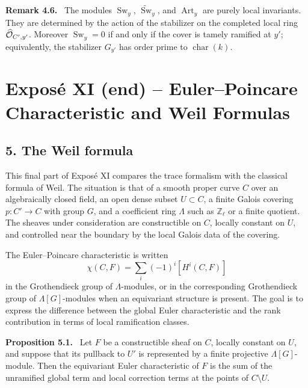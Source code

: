 \documentclass[11pt]{article}
\theoremstyle{plain}
\theoremstyle{definition}
\theoremstyle{remark}
\newenvironment{statement}[1]{\par\medskip\noindent\textbf{#1.}\ }{\par\medskip}
\newcommand{\ZZ}{\mathbb Z}
\newcommand{\wt}[1]{\widetilde{#1}}
\providecommand{\Sw}{\operatorname{Sw}}
\providecommand{\Art}{\operatorname{Art}}
\providecommand{\wh}{\widehat}
\begin{document}
\begin{statement}{Remark 4.6}
The modules $\Sw_y$, $\wt{\Sw}_y$, and $\Art_y$ are purely local invariants. They are determined by the action of the stabilizer on the completed local ring $\wh{\cO}_{C',y'}$. Moreover $\Sw_y=0$ if and only if the cover is tamely ramified at $y'$; equivalently, the stabilizer $G_{y'}$ has order prime to $\operatorname{char}(k)$.
\end{statement}

\newpage

\section*{Expos\'e XI (end) -- Euler--Poincare Characteristic and Weil Formulas}

\subsection*{5. The Weil formula}

This final part of Expos\'e XI compares the trace formalism with the classical formula of Weil. The situation is that of a smooth proper curve $C$ over an algebraically closed field, an open dense subset $U\subset C$, a finite Galois covering $p:C'\to C$ with group $G$, and a coefficient ring $\Lambda$ such as $\ZZ_\ell$ or a finite quotient. The sheaves under consideration are constructible on $C$, locally constant on $U$, and controlled near the boundary by the local Galois data of the covering.

The Euler--Poincare characteristic is written
\[
   \chi(C,F)=\sum_i(-1)^i[H^i(C,F)]
\]
in the Grothendieck group of $\Lambda$-modules, or in the corresponding Grothendieck group of $\Lambda[G]$-modules when an equivariant structure is present. The goal is to express the difference between the global Euler characteristic and the rank contribution in terms of local ramification classes.

\begin{statement}{Proposition 5.1}
Let $F$ be a constructible sheaf on $C$, locally constant on $U$, and suppose that its pullback to $U'$ is represented by a finite projective $\Lambda[G]$-module. Then the equivariant Euler characteristic of $F$ is the sum of the unramified global term and local correction terms at the points of $C\setminus U$.
\end{statement}
\end{document}
